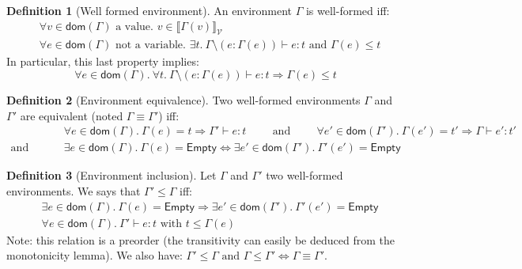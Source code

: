 \documentclass[a4paper]{article}%
\newcommand{\dom}[1]{\textsf{dom}(#1)}
\newcommand{\Empty} {\textsf{Empty}}%
\newcommand{\values}[0]{\mathcal{V}}
\newcommand{\valsemantic}[1]{{\llbracket #1 \rrbracket}_{\values}}
\theoremstyle{definition}
\newtheorem{definition}{Definition}
\begin{document}
      \begin{definition}[Well formed environment]
        An environment $\Gamma$ is well-formed iff:
        \begin{align*}
          &\forall v \in \dom \Gamma \text{ a value. } v \in \valsemantic {\Gamma(v)}\\
          &\forall e \in \dom \Gamma \text{ not a variable. } \exists t.\ \Gamma\setminus(e:\Gamma(e)) \vdash e : t \text{ and } \Gamma(e) \leq t
        \end{align*}
        In particular, this last property implies:
        \[
          \forall e \in \dom \Gamma.\ \forall t.\ \Gamma\setminus(e:\Gamma(e)) \vdash e : t \Rightarrow \Gamma(e) \leq t
        \]
      \end{definition}

      \begin{definition}[Environment equivalence]
        Two well-formed environments $\Gamma$ and $\Gamma'$ are equivalent (noted $\Gamma \equiv \Gamma'$) iff:
        \begin{align*} 
          &\forall e \in \dom \Gamma.\ \Gamma(e)=t \Rightarrow \Gamma' \vdash e:t \hspace{1cm} \text{and} \hspace{1cm}
          \forall e' \in \dom {\Gamma'}.\ \Gamma(e')=t' \Rightarrow \Gamma \vdash e':t' \\
          \text{and} \hspace{1cm} &\exists e\in \dom \Gamma.\ \Gamma(e)=\Empty \Leftrightarrow \exists e'\in \dom {\Gamma'}.\ \Gamma'(e')=\Empty
        \end{align*}
      \end{definition}
    
      \begin{definition}[Environment inclusion]
        Let $\Gamma$ and $\Gamma'$ two well-formed environments. We says that $\Gamma' \leq \Gamma$ iff:
        \begin{align*}
          &\exists e\in \dom \Gamma.\ \Gamma(e)=\Empty \Rightarrow \exists e'\in \dom {\Gamma'}.\ \Gamma'(e')=\Empty\\
          &\forall e \in \dom \Gamma.\ \Gamma' \vdash e : t \text{ with } t \leq \Gamma(e)
        \end{align*}
        Note: this relation is a preorder (the transitivity can easily be deduced from the monotonicity lemma).
        We also have: $\Gamma' \leq \Gamma \text{ and } \Gamma \leq \Gamma' \Leftrightarrow \Gamma \equiv \Gamma'$.
      \end{definition}
    
\end{document}
